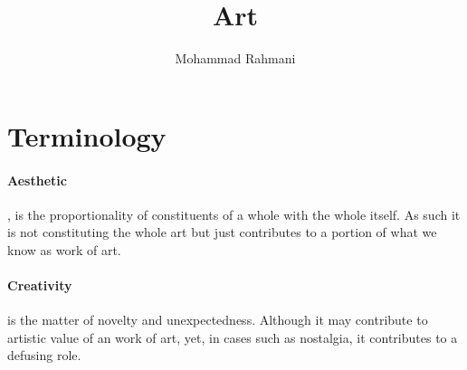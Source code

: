 \documentclass{article}
\begin{document}
	
	\title{Art}
	\author{Mohammad Rahmani}
	\date{}
	\maketitle
	\section{Terminology}
		\paragraph{Aesthetic},  is the proportionality of constituents of a whole with the whole itself. As such it is not constituting the whole art but just contributes to a portion of what we know as work of art.
		\paragraph{Creativity} is the matter of novelty and unexpectedness. Although it may contribute to artistic value of an work of art, yet, in cases such as nostalgia, it contributes to a defusing role.  
	
\end{document}
